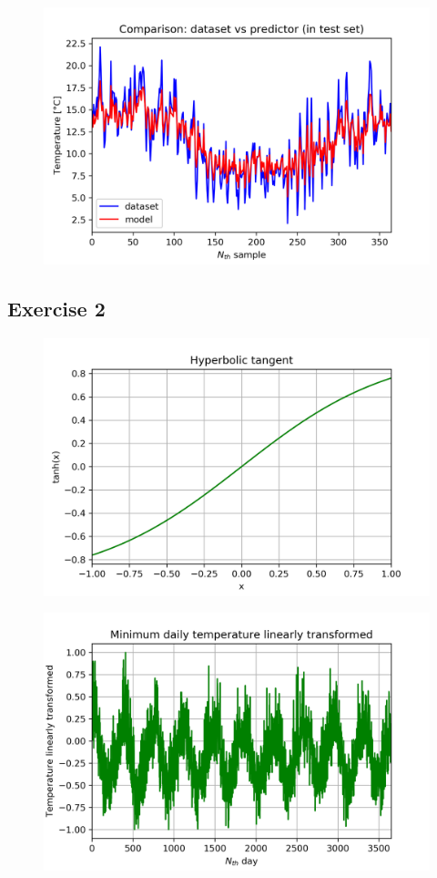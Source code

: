 \documentclass[a4paper]{article}
\begin{document}
\begin{figure}[ht]
    \centering
    \includegraphics[width=12cm]{figure_3_predictor}
    \caption{}
    \label{fig:ex1-3}
\end{figure}

\subsection{Exercise 2}

\begin{figure}[ht]
    \centering
    \includegraphics[width=12cm]{figure_1_hyperbolic_tangent}
    \caption{}
    \label{fig:pre-ex2-1}
\end{figure}

\begin{figure}[ht]
    \centering
    \includegraphics[width=12cm]{figure_2_linear_transformation}
    \caption{}
    \label{fig:pre-ex2-2}
\end{figure}
\end{document}
